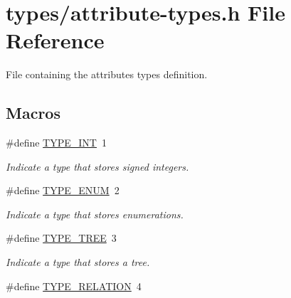 \hypertarget{attribute-types_8h}{}\section{types/attribute-\/types.h File Reference}
\label{attribute-types_8h}


File containing the attribute\textquotesingle{}s types definition.  


\subsection*{Macros}
\begin{DoxyCompactItemize}
\item 
\#define \hyperlink{attribute-types_8h_a56e5f9a95536838408fcca8f22d541b4}{T\+Y\+P\+E\+\_\+\+I\+NT}~1\hypertarget{attribute-types_8h_a56e5f9a95536838408fcca8f22d541b4}{}\label{attribute-types_8h_a56e5f9a95536838408fcca8f22d541b4}

\begin{DoxyCompactList}\small\item\em Indicate a type that stores signed integers. \end{DoxyCompactList}\item 
\#define \hyperlink{attribute-types_8h_aee675b6c98404bb71350fab3dd49a9b8}{T\+Y\+P\+E\+\_\+\+E\+N\+UM}~2\hypertarget{attribute-types_8h_aee675b6c98404bb71350fab3dd49a9b8}{}\label{attribute-types_8h_aee675b6c98404bb71350fab3dd49a9b8}

\begin{DoxyCompactList}\small\item\em Indicate a type that stores enumerations. \end{DoxyCompactList}\item 
\#define \hyperlink{attribute-types_8h_a5550b800a4fcb6008fc9cf188fd073f0}{T\+Y\+P\+E\+\_\+\+T\+R\+EE}~3\hypertarget{attribute-types_8h_a5550b800a4fcb6008fc9cf188fd073f0}{}\label{attribute-types_8h_a5550b800a4fcb6008fc9cf188fd073f0}

\begin{DoxyCompactList}\small\item\em Indicate a type that stores a tree. \end{DoxyCompactList}\item 
\#define \hyperlink{attribute-types_8h_ae1242c874629cb956a1ab8c764ae2e05}{T\+Y\+P\+E\+\_\+\+R\+E\+L\+A\+T\+I\+ON}~4\hypertarget{attribute-types_8h_ae1242c874629cb956a1ab8c764ae2e05}{}\label{attribute-types_8h_ae1242c874629cb956a1ab8c764ae2e05}


\end{DoxyCompactItemize}
